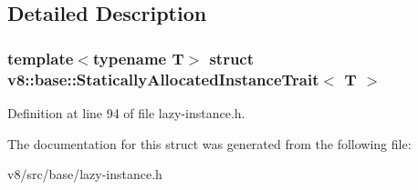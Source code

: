 \subsection{Detailed Description}
\subsubsection*{template$<$typename T$>$\newline
struct v8\+::base\+::\+Statically\+Allocated\+Instance\+Trait$<$ T $>$}



Definition at line 94 of file lazy-\/instance.\+h.



The documentation for this struct was generated from the following file\+:\begin{DoxyCompactItemize}
\item 
v8/src/base/lazy-\/instance.\+h\end{DoxyCompactItemize}
